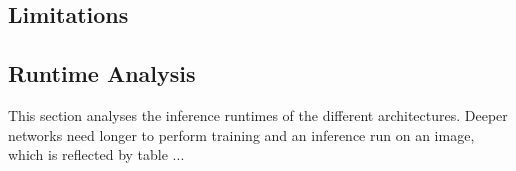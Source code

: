 
\subsection{Limitations}





\subsection{Runtime Analysis}

This section analyses the inference runtimes of the different architectures. Deeper networks need longer to perform training and an inference run on an image, which is reflected by table ...